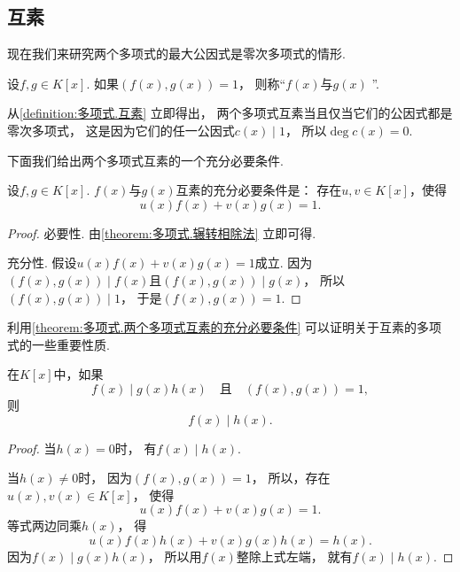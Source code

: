 \subsection{互素}
现在我们来研究两个多项式的最大公因式是零次多项式的情形.

\begin{definition}\label{definition:多项式.互素}
设\(f,g \in K[x]\).
如果\((f(x),g(x))=1\)，
则称“\(f(x)\)与\(g(x)\) ”.
\end{definition}

从\cref{definition:多项式.互素} 立即得出，
两个多项式互素当且仅当它们的公因式都是零次多项式，
这是因为它们的任一公因式\(c(x) \mid 1\)，
所以\(\deg c(x) = 0\).

下面我们给出两个多项式互素的一个充分必要条件.
\begin{theorem}\label{theorem:多项式.两个多项式互素的充分必要条件}
设\(f,g \in K[x]\).
\(f(x)\)与\(g(x)\)互素的充分必要条件是：
存在\(u,v \in K[x]\)，使得\[
	u(x) f(x) + v(x) g(x) = 1.
\]
\begin{proof}
必要性.
由\cref{theorem:多项式.辗转相除法} 立即可得.

充分性.
假设\(u(x) f(x) + v(x) g(x) = 1\)成立.
因为\((f(x),g(x)) \mid f(x)\)且\((f(x),g(x)) \mid g(x)\)，
所以\((f(x),g(x)) \mid 1\)，
于是\((f(x),g(x)) = 1\).
\end{proof}
\end{theorem}

利用\cref{theorem:多项式.两个多项式互素的充分必要条件} 可以证明关于互素的多项式的一些重要性质.

\begin{property}\label{theorem:多项式.互素.性质1}
在\(K[x]\)中，如果\[
	f(x) \mid g(x) h(x)
	\quad\text{且}\quad
	(f(x),g(x))=1,
\]
则\[
	f(x) \mid h(x).
\]
\begin{proof}
当\(h(x)=0\)时，
有\(f(x) \mid h(x)\).

当\(h(x)\neq0\)时，
因为\((f(x),g(x))=1\)，
所以，存在\(u(x),v(x) \in K[x]\)，
使得\[
	u(x) f(x) + v(x) g(x) = 1.
\]
等式两边同乘\(h(x)\)，
得\[
	u(x) f(x) h(x) + v(x) g(x) h(x) = h(x).
\]
因为\(f(x) \mid g(x) h(x)\)，
所以用\(f(x)\)整除上式左端，
就有\(f(x) \mid h(x)\).
\end{proof}
\end{property}

